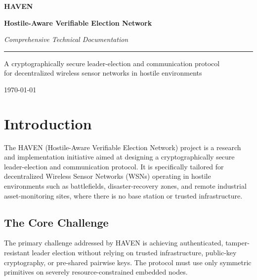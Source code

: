 \documentclass[11pt,a4paper]{article}
\newcommand{\citeref}[1]{}
\begin{document}
\begin{titlepage}
\centering
\vspace*{3cm}
{\fontsize{48}{54}\selectfont\bfseries\color{havennavy} HAVEN\par}
\vspace{0.4cm}
{\Large\bfseries\color{havensteel} Hostile-Aware Verifiable Election Network\par}
\vspace{0.2cm}
{\large\itshape\color{havenmute} Comprehensive Technical Documentation\par}
\vspace{1.2cm}
{\color{havensteel}\rule{0.6\textwidth}{0.8pt}}
\vfill
{\normalsize\color{havenmute}
A cryptographically secure leader-election and communication protocol\\
for decentralized wireless sensor networks in hostile environments\par}
\vspace{1.5cm}
{\small\color{havenmute} \today \par}
\end{titlepage}

\tableofcontents
\thispagestyle{fancy}
\newpage

\section{Introduction}

The HAVEN (Hostile-Aware Verifiable Election Network) project is a research and implementation initiative aimed at designing a cryptographically secure leader-election and communication protocol.\citeref{1,4} It is specifically tailored for decentralized Wireless Sensor Networks (WSNs) operating in hostile environments such as battlefields, disaster-recovery zones, and remote industrial asset-monitoring sites, where there is no base station or trusted infrastructure.\citeref{1,4}

\subsection{The Core Challenge}

The primary challenge addressed by HAVEN is achieving authenticated, tamper-resistant leader election without relying on trusted infrastructure, public-key cryptography, or pre-shared pairwise keys.\citeref{1,4} The protocol must use only symmetric primitives on severely resource-constrained embedded nodes.\citeref{4}
\end{document}
